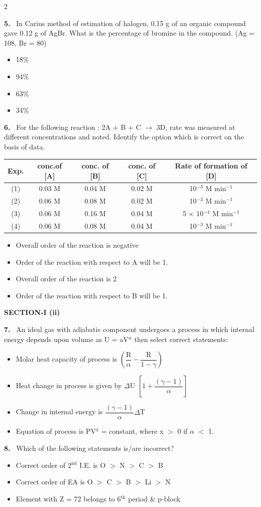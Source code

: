 \documentclass[10pt]{extarticle}
\newcommand{\sect}[1]{\par\smallskip\noindent\textbf{#1}\par}
\newcommand{\qn}[1]{\par\smallskip\noindent\textbf{#1.}~}
\newenvironment{qoptions}{\begin{itemize}[leftmargin=1.8em,itemsep=1pt,topsep=2pt,label={}]}{\end{itemize}}
\newcommand{\opt}[2]{\item[(#1)] #2}
\begin{document}
\begin{multicols}{2}
\qn{5} In Carius method of estimation of halogen, 0.15 g of an organic compound gave 0.12 g of AgBr. What is the percentage of bromine in the compound. (Ag = 108, Br = 80)
\begin{qoptions}
\opt{A}{18\%}
\opt{B}{94\%}
\opt{C}{63\%}
\opt{D}{34\%}
\end{qoptions}
\qn{6} For the following reaction : 2A + B + C $\longrightarrow$ 3D, rate was measured at different concentrations and noted. Identify the option which is correct on the basis of data.\par
{\scriptsize\setlength{\tabcolsep}{1pt}\noindent\begin{tabular}{|c|c|c|c|c|}
\hline
Exp. & conc.of [A] & conc. of [B] & conc. of [C] & Rate of formation of [D] \\ \hline
(1) & 0.03 M & 0.04 M & 0.02 M & 10$^{-3}$ M min$^{-1}$ \\ \hline
(2) & 0.06 M & 0.08 M & 0.02 M & 10$^{-3}$ M min$^{-1}$ \\ \hline
(3) & 0.06 M & 0.16 M & 0.04 M & 5 $\times$ 10$^{-4}$ M min$^{-1}$ \\ \hline
(4) & 0.06 M & 0.08 M & 0.04 M & 10$^{-3}$ M min$^{-1}$ \\ \hline
\end{tabular}}\par
\begin{qoptions}
\opt{A}{Overall order of the reaction is negative}
\opt{B}{Order of the reaction with respect to A will be 1.}
\opt{C}{Overall order of the reaction is 2}
\opt{D}{Order of the reaction with respect to B will be 1.}
\end{qoptions}
\sect{SECTION-I (ii)}
\qn{7} An ideal gas with adiabatic component undergoes a process in which internal energy depends upon volume as U = aV$^\alpha$ then select correct statements:
\begin{qoptions}
\opt{A}{Molar heat capacity of process is $\left(\dfrac{\text{R}}{\alpha}-\dfrac{\text{R}}{1-\gamma}\right)$}
\opt{B}{Heat change in process is given by $\Delta$U $\left[1+\dfrac{(\gamma-1)}{\alpha}\right]$}
\opt{C}{Change in internal energy is $\dfrac{(\gamma-1)}{\alpha}\Delta$T}
\opt{D}{Equation of process is PV$^\text{x}$ = constant, where x $>$ 0 if $\alpha$ $<$ 1.}
\end{qoptions}
\qn{8} Which of the following statements is/are incorrect?
\begin{qoptions}
\opt{A}{Correct order of 2$^{\text{nd}}$ I.E. is O $>$ N $>$ C $>$ B}
\opt{B}{Correct order of EA is O $>$ C $>$ B $>$ Li $>$ N}
\opt{C}{Element with Z = 72 belongs to 6$^{\text{th}}$ period \& p-block}

\end{qoptions}
\end{multicols}
\end{document}
